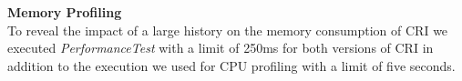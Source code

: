 	\textbf{Memory Profiling}\\
	To reveal the impact of a large history on the memory consumption of CRI we executed \emph{PerformanceTest} with a limit of 250ms for both versions of CRI in addition to the execution we used for CPU profiling with a limit of five seconds.
	\begin{figure}[!h]
		\centering
		\hspace{1cm}
		\hspace{10cm} %

\end{figure}
